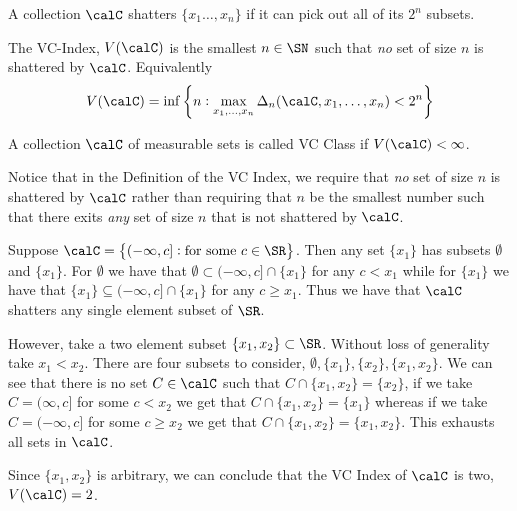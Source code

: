 \begin{definition}[Shattering]
	\label{def:shattering}
	A collection \(\calC\) shatters \(\{x_1\dots,x_n\}\) if it can pick out all of its \(2^n\) subsets.
\end{definition}

\begin{definition}[VC Index]
	\label{def:vc-index}
	The VC-Index, \(V(\calC)\) is the smallest \(n\in\SN\) such that \emph{no} set of size \(n\) is shattered by \(\calC\). Equivalently
	\begin{equation}
		\label{eq:vc-index}
		V(\calC) = \inf\left\{n : \max_{x_1,\dots,x_n} \Delta_n(\calC,x_1,\dots,x_n)<2^n\right\}
	\end{equation}
\end{definition}

\begin{definition}[VC Class]
	\label{def:vc-class}
	A collection \(\calC\) of measurable sets is called VC Class if  \(V(\calC)<\infty\). 
\end{definition} 

\begin{remark*}
	Notice that in the Definition of the VC Index, we require that \textit{no} set of size \(n\) is shattered by \(\calC\) rather than requiring that \(n\) be the smallest number such that there exits \textit{any} set of size \(n\) that is not shattered by \(\calC\).
\end{remark*}

\begin{example*}
	\label{ex:vc-indices}
	Suppose \(\calC = \left\{(-\infty,c]:\text{for some }c\in\SR\right\}\). Then any set \(\{x_1\}\) has subsets \(\emptyset\) and \(\{x_1\}.\) For \(\emptyset\) we have that \(\emptyset \subset (-\infty,c]\cap \{x_1\} \) for any \(c < x_1\) while for \(\{x_1\}\) we have that \(\{x_1\}\subseteq (-\infty,c]\cap\{x_1\} \) for any \(c \geq x_1\). Thus we have that \(\calC\) shatters any single element subset of \(\SR\).

	However, take a two element subset \(\{x_1,x_2\}\subset \SR\). Without loss of generality take \(x_1 < x_2\). There are four subsets to consider, \(\emptyset, \{x_1\},\{x_2\},\{x_1,x_2\}\). We can see that there is no set \(C \in \calC\) such that \(C \cap \{x_1,x_2\} = \{x_2\}\), if we take \(C = (\infty,c]\) for some \(c < x_2\) we get that \(C \cap \{x_1,x_2\} = \{x_1\}\) whereas if we take \(C = (-\infty, c]\) for some \(c \geq x_2\) we get that \(C\cap\{x_1,x_2\} = \{x_1,x_2\}\). This exhausts all sets in \(\calC\). 

	Since \(\{x_1,x_2\}\) is arbitrary, we can conclude that the VC Index of \(\calC\) is two, \(V(\calC)=2\).
\end{example*}

